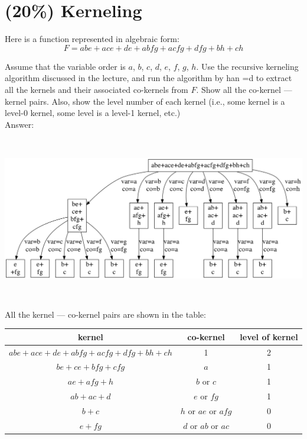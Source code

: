 \documentclass[12pt]{article}
\begin{document}
\section{(20\%) Kerneling}
Here is a function represented in algebraic form:
\[F=abe+ace+de+abfg+acfg+dfg+bh+ch\]

Assume that the variable order is $a$, $b$, $c$, $d$, $e$, $f$, $g$, $h$.
Use the recursive kerneling algorithm discussed in the lecture,
and run the algorithm by han =d to extract all the kernels and their associated co-kernels from $F$.
Show all the co-kernel --- kernel pairs.
Also, show the level number of each kernel
(i.e., some kernel is a level-0 kernel,
some level is a level-1 kernel, etc.)\\

Answer:

\begin{center}
    \includegraphics[width = 6.50in, height = 2.80in]{kernel.png}
\end{center}

All the kernel --- co-kernel pairs are shown in the table:
\begin{center}
    \tabcolsep=8pt
    \begin{tabular}{|c|c|c|}
        \hline
        kernel & co-kernel & level of kernel \\
        \hline
        $abe+ace+de+abfg+acfg+dfg+bh+ch$ & 1                    & 2 \\
        $be+ce+bfg+cfg$                  & $a$                  & 1 \\ 
        $ae+afg+h$                       & $b$ or $c$           & 1 \\
        $ab+ac+d$                        & $e$ or $fg$          & 1 \\
        $b+c$                            & $h$ or $ae$ or $afg$ & 0 \\
        $e+fg$                           & $d$ or $ab$ or $ac$  & 0 \\
        \hline
    \end{tabular}
\end{center}
\end{document}

